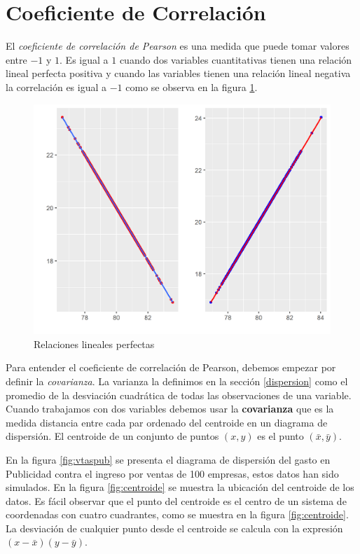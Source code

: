 \documentclass[letterpaper,]{book}
\begin{document}
\hypertarget{correl}{%
\section{Coeficiente de Correlación}\label{correl}}

El \emph{coeficiente de correlación de Pearson} es una medida que puede tomar valores entre \(-1\) y \(1\). Es igual a \(1\) cuando dos variables cuantitativas tienen una relación lineal perfecta positiva y cuando las variables tienen una relación lineal negativa la correlación es igual a \(-1\) como se observa en la figura \ref{fig:corr5}.

\begin{figure}[!h]

{\centering \includegraphics[width=0.5\linewidth]{corr4} 

}

\caption{Relaciones lineales perfectas}\label{fig:corr5}
\end{figure}

Para entender el coeficiente de correlación de Pearson, debemos empezar por definir la \emph{covarianza}. La varianza la definimos en la sección \ref{dispersion} como el promedio de la desviación cuadrática de todas las observaciones de una variable. Cuando trabajamos con dos variables debemos usar la \textbf{covarianza} que es la medida distancia entre cada par ordenado del centroide en un diagrama de dispersión. El centroide de un conjunto de puntos \(\left(x,y\right)\) es el punto \(\left(\bar{x},\bar{y}\right)\).

En la figura \ref{fig:vtaspub} se presenta el diagrama de dispersión del gasto en Publicidad contra el ingreso por ventas de 100 empresas, estos datos han sido simulados. En la figura \ref{fig:centroide} se muestra la ubicación del centroide de los datos. Es fácil observar que el punto del centroide es el centro de un sistema de coordenadas con cuatro cuadrantes, como se muestra en la figura \ref{fig:centroide}. La desviación de cualquier punto desde el centroide se calcula con la expresión \(\left(x-\bar{x}\right)\left(y-\bar{y}\right)\).
\end{document}
